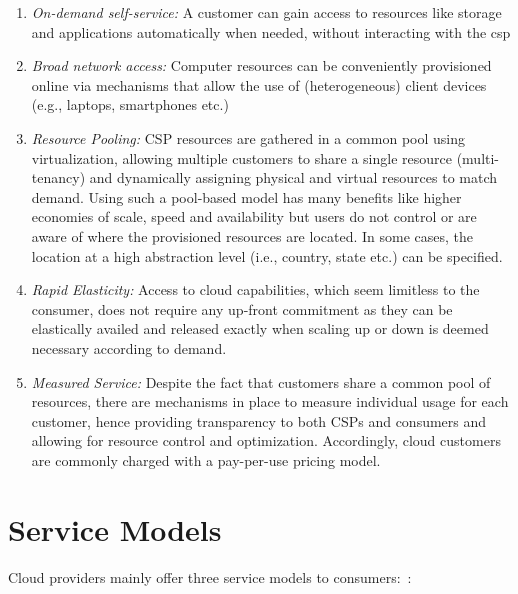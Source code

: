 \begin{enumerate} [I]
    \item \textit{On-demand self-service:} A customer can gain access to resources like storage and applications automatically when needed, without interacting with the \ac{csp}

    \item \textit{Broad network access:} Computer resources can be conveniently provisioned online via mechanisms that allow the use of (heterogeneous) client devices (e.g., laptops, smartphones etc.)

    \item \textit{Resource Pooling:} CSP resources are gathered in a common pool using virtualization, allowing multiple customers to share a single resource (multi-tenancy) and dynamically assigning physical and virtual resources to match demand. Using such a pool-based model has many benefits like higher economies of scale, speed and availability but users do not control or are aware of where the provisioned resources are located. In some cases, the location at a high abstraction level (i.e., country, state etc.) can be specified.

    \item \textit{Rapid Elasticity:} Access to cloud capabilities, which seem limitless to the consumer, does not require any up-front commitment as they can be elastically availed and released exactly when scaling up or down is deemed necessary according to demand.

    \item \textit{Measured Service:} Despite the fact that customers share a common pool of resources, there are mechanisms in place to measure individual usage for each customer, hence providing transparency to both CSPs and consumers and allowing for resource control and optimization. Accordingly, cloud customers are commonly charged with a pay-per-use pricing model.
\end{enumerate}


\section{Service Models}
Cloud providers mainly offer three service models to consumers:~\cite{nist,c2,c1}:

